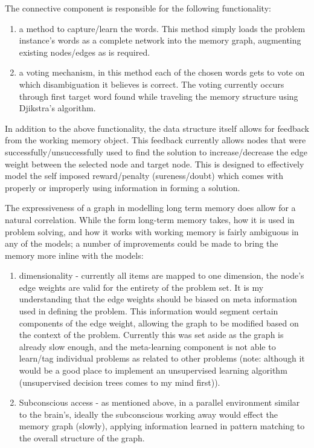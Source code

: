 The connective component is responsible for the following functionality:

\begin{enumerate}     \item a method to capture/learn the words.  This method
simply loads the problem instance's words as a complete network into the memory
graph, augmenting existing nodes/edges as is required.     \item a voting
mechanism, in this method each of the chosen words gets to vote on which
disambiguation it believes is correct.  The voting currently occurs through
first target word found while traveling the memory structure using Djikstra's
algorithm. \end{enumerate}

In addition to the above functionality, the data structure itself allows for
feedback from the working memory object.  This feedback currently allows nodes
that were successfully/unsuccessfully used to find the solution to
increase/decrease the edge weight between the selected node and target node.
This is designed to effectively model the self imposed reward/penalty
(sureness/doubt) which comes with properly or improperly using information in
forming a solution.

The expressiveness of a graph in modelling long term memory does allow for a
natural correlation. While the form long-term memory takes, how it is used in
problem solving, and how it works with working memory is fairly ambiguous in any
of the models; a number of improvements could be made to bring the memory more
inline with the models:

\begin{enumerate}     \item dimensionality - currently all items are mapped to
one dimension, the node's edge weights are valid for the entirety of the problem
set.  It is my understanding that the edge weights should be biased on meta
information used in defining the problem.  This information would segment
certain components of the edge weight, allowing the graph to be modified based
on the context of the problem.  Currently this was set aside as the graph is
already slow enough, and the meta-learning component is not able to learn/tag
individual problems as related to other problems (note: although it would be a
good place to implement an unsupervised learning algorithm (unsupervised
decision trees comes to my mind first)).     \item Subconscious access - as
mentioned above, in a parallel environment similar to the brain's, ideally the
subconscious working away would effect the memory graph (slowly), applying
information learned in pattern matching to the overall structure of the graph.
\end{enumerate}


